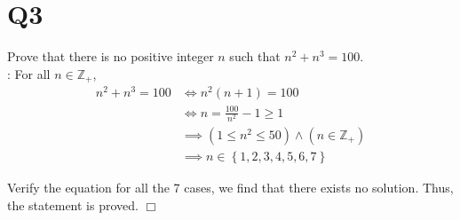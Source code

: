 \documentclass[11pt]{article}
\def\endproofmark{$\Box$}
\newenvironment{proof}{{\bf Proof}:}{\endproofmark\smallskip}
\begin{document}
\section*{Q3}
Prove that there is no positive integer $n$ such that
$n^{2}+n^{3}=100$.
\\
\begin{proof}
    For all $n \in \mathbb{Z}_{+}$,
    \begin{align*}
        n^{2}+n^{3}=100 &\iff n^{2}(n+1)=100\\
        &\iff n=\frac{100}{n^{2}}-1 \ge 1\\
        &\implies (1 \le n^{2} \le 50)\land (n \in \mathbb{Z}_+)\\
        &\implies n \in \left\{ 1,2,3,4,5,6,7 \right\}
    \end{align*}

    Verify the equation for all the 7 cases, we find that
    there exists no solution. 
    Thus, the statement is proved.
\end{proof}
\end{document}
